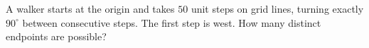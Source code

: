 A walker starts at the origin and takes $50$ unit steps on grid lines, turning exactly $90^\circ$ between consecutive steps. The first step is west. How many distinct endpoints are possible?
